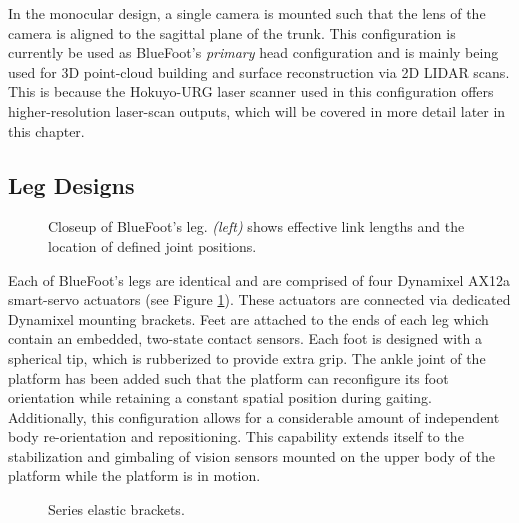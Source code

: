 				In the monocular design, a single camera is mounted such that the lens of the camera is aligned to the sagittal plane of the trunk. This configuration is currently be used as BlueFoot's \emph{primary} head configuration and is mainly being used for 3D point-cloud building and surface reconstruction via 2D LIDAR scans. This is because the Hokuyo-URG laser scanner used in this configuration offers higher-resolution laser-scan outputs, which will be covered in more detail later in this chapter.

		\subsection{Leg Designs}

			\begin{figure}[h!]
				\centering
				\caption{Closeup of BlueFoot's leg. \emph{(left)} shows effective link lengths and the location of defined joint positions.}
				\label{fig::leg_labeled}
			\end{figure}
				
			Each of BlueFoot's legs are identical and are comprised of four Dynamixel AX12a smart-servo actuators (see Figure \ref{fig::leg_labeled}). These actuators are connected via dedicated Dynamixel mounting brackets. Feet are attached to the ends of each leg which contain an embedded, two-state contact sensors. Each foot is designed with a spherical tip, which is rubberized to provide extra grip. The ankle joint of the platform has been added such that the platform can reconfigure its foot orientation while retaining a constant spatial position during gaiting. Additionally, this configuration allows for a considerable amount of independent body re-orientation and repositioning. This capability extends itself to the stabilization and gimbaling of vision sensors mounted on the upper body of the platform while the platform is in motion.
		
			\begin{figure}[h!]
				\centering
				\caption{Series elastic brackets.}
				\label{fig::sea_bracket}
			\end{figure}

